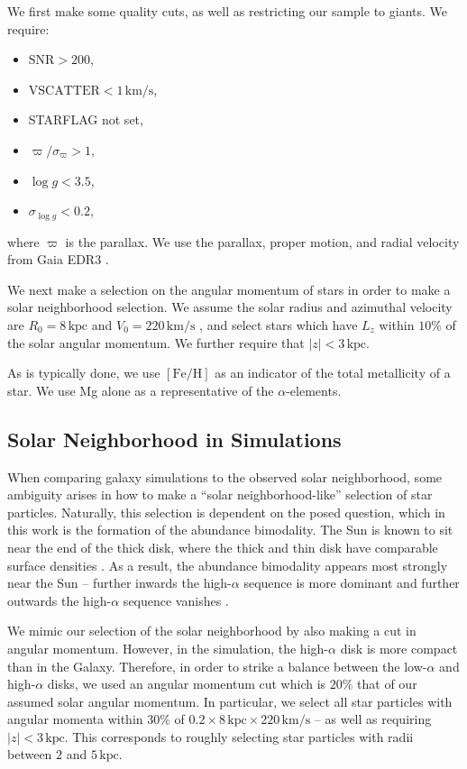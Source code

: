 \documentclass[linenumbers, twocolumn]{aastex631}
\newcommand{\kpc}{\ensuremath{\textrm{kpc}}}
\newcommand{\kms}{\ensuremath{\textrm{km}/\textrm{s}}}
\newcommand{\FeH}{\ensuremath{[\textrm{Fe}/\textrm{H}]}}
\begin{document}
We first make some quality cuts, as well as restricting our sample to giants. We require:
\begin{itemize}[noitemsep]
    \item $\textrm{SNR} > 200$,
    \item $\textrm{VSCATTER} < 1\,\kms$,
    \item STARFLAG not set,
    \item $\varpi/\sigma_{\varpi} > 1$,
    \item $\log{g} < 3.5$,
    \item $\sigma_{\log{g}} < 0.2$,
\end{itemize}
where $\varpi$ is the parallax. We use the parallax, proper motion, and radial velocity from Gaia EDR3 \citep{2016AA...595A...1G,2021AA...649A...1G,2021AA...649A...2L,2021AA...653A.160S}.

We next make a selection on the angular momentum of stars in order to make a solar neighborhood selection. We assume the solar radius and azimuthal velocity are $R_0=8\,\kpc$ and $V_0=220\,\kms$ \citep{2016ARA&A..54..529B}, and select stars which have $L_z$ within $10\%$ of the solar angular momentum. We further require that $\left|z\right| < 3\,\kpc$.

As is typically done, we use \FeH{} as an indicator of the total metallicity of a star. We use Mg alone as a representative of the $\alpha$-elements.

\subsection{Solar Neighborhood in Simulations}\label{ssec:solarneigh}
When comparing galaxy simulations to the observed solar neighborhood, some ambiguity arises in how to make a ``solar neighborhood-like'' selection of star particles. Naturally, this selection is dependent on the posed question, which in this work is the formation of the abundance bimodality. The Sun is known to sit near the end of the thick disk, where the thick and thin disk have comparable surface densities \citep[the ratio of thick-to-thin is $\sim12\%$][]{2016ARA&A..54..529B}. As a result, the abundance bimodality appears most strongly near the Sun -- further inwards the high-$\alpha$ sequence is more dominant and further outwards the high-$\alpha$ sequence vanishes \citep[e.g.,][]{2015ApJ...808..132H}.

We mimic our selection of the solar neighborhood by also making a cut in angular momentum. However, in the simulation, the high-$\alpha$ disk is more compact than in the Galaxy. Therefore, in order to strike a balance between the low-$\alpha$ and high-$\alpha$ disks, we used an angular momentum cut which is $20\%$ that of our assumed solar angular momentum. In particular, we select all star particles with angular momenta within $30\%$ of $0.2\times8\,\kpc\times220\,\kms$ -- as well as requiring $\left| z \right| < 3\,\kpc$. This corresponds to roughly selecting star particles with radii between $2$ and $5\,\kpc$.
\end{document}
